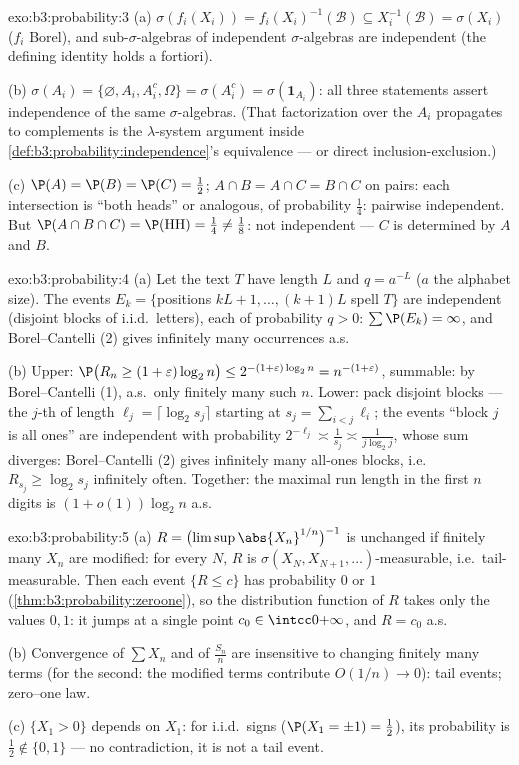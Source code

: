 \begin{solution}{exo:b3:probability:3}
(a) $\sigma(f_i(X_i)) = f_i(X_i)^{-1}(\mathcal B) \subseteq
X_i^{-1}(\mathcal B) = \sigma(X_i)$ ($f_i$ Borel), and
sub-$\sigma$-algebras of independent $\sigma$-algebras are
independent (the defining identity holds a fortiori).

(b) $\sigma(A_i) = \{\varnothing, A_i, A_i^c, \Omega\} =
\sigma(A_i^c) = \sigma(\mathbf 1_{A_i})$: all three
statements assert independence of the same
$\sigma$-algebras. (That factorization over the $A_i$
propagates to complements is the $\lambda$-system argument
inside \cref{def:b3:probability:independence}'s equivalence
--- or direct inclusion-exclusion.)

(c) $\P(A) = \P(B) = \P(C) = \frac12$; $A\cap B = A\cap C =
B\cap C$ on pairs: each intersection is ``both heads'' or
analogous, of probability $\frac14$: pairwise independent.
But $\P(A\cap B\cap C) = \P(\text{HH}) = \frac14 \neq
\frac18$: not independent --- $C$ is determined by $A$ and
$B$.
\end{solution}

\begin{solution}{exo:b3:probability:4}
(a) Let the text $T$ have length $L$ and $q = a^{-L}$ ($a$
the alphabet size). The events $E_k = \{$positions $kL+1,
\dots, (k+1)L$ spell $T\}$ are independent (disjoint blocks
of i.i.d.\ letters), each of probability $q > 0$: $\sum\P(E_k)
= \infty$, and Borel--Cantelli (2) gives infinitely many
occurrences a.s.

(b) Upper: $\P\bigl(R_n \geq (1+\varepsilon)\log_2n\bigr)
\leq 2^{-(1+\varepsilon)\log_2n} = n^{-(1+\varepsilon)}$,
summable: by Borel--Cantelli (1), a.s.\ only finitely many
such $n$. Lower: pack disjoint blocks --- the $j$-th of
length $\ell_j = \lceil\log_2s_j\rceil$ starting at $s_j =
\sum_{i<j}\ell_i$; the events ``block $j$ is all ones'' are
independent with probability $2^{-\ell_j} \asymp
\frac1{s_j} \asymp \frac1{j\log_2 j}$, whose sum diverges:
Borel--Cantelli (2) gives infinitely many all-ones blocks,
i.e.\ $R_{s_j} \geq \log_2 s_j$ infinitely often. Together:
the maximal run length in the first $n$ digits is
$(1 + o(1))\log_2n$ a.s.
\end{solution}

\begin{solution}{exo:b3:probability:5}
(a) $R = \bigl(\limsup\abs{X_n}^{1/n}\bigr)^{-1}$ is
unchanged if finitely many $X_n$ are modified: for every $N$,
$R$ is $\sigma(X_N, X_{N+1}, \dots)$-measurable, i.e.\
tail-measurable. Then each event $\{R \leq c\}$ has
probability $0$ or $1$ (\cref{thm:b3:probability:zeroone}),
so the distribution function of $R$ takes only the values
$0, 1$: it jumps at a single point $c_0 \in
\intcc0{+\infty}$, and $R = c_0$ a.s.

(b) Convergence of $\sum X_n$ and of $\frac{S_n}n$ are
insensitive to changing finitely many terms (for the second:
the modified terms contribute $O(1/n) \to 0$): tail events;
zero--one law.

(c) $\{X_1 > 0\}$ depends on $X_1$: for i.i.d.\ signs
($\P(X_1 = \pm1) = \frac12$), its probability is $\frac12
\notin \{0,1\}$ --- no contradiction, it is not a tail
event.
\end{solution}

